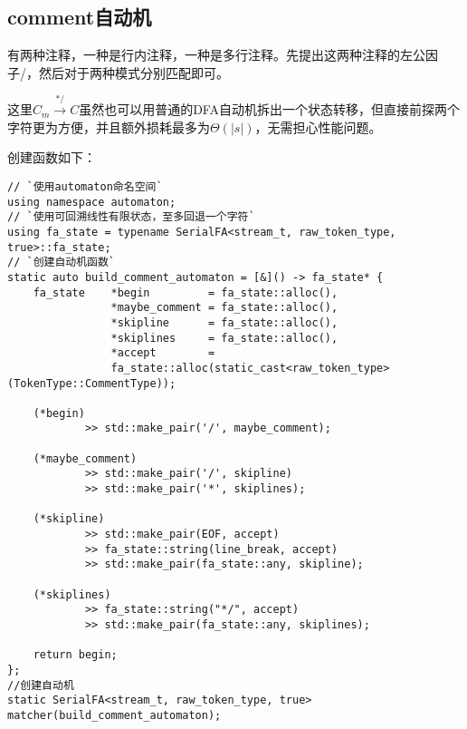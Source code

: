 \documentclass[UTF8]{ctexart}
\begin{document}
\subsection{comment自动机}
\begin{figure}[!h]
    \centering
\end{figure}

\par 有两种注释，一种是行内注释，一种是多行注释。先提出这两种注释的左公因子/，然后对于两种模式分别匹配即可。
\par 这里$C_m\xrightarrow{\text{*/}}C$虽然也可以用普通的DFA自动机拆出一个状态转移，但直接前探两个字符更为方便，并且额外损耗最多为$\Theta (|s|)$，无需担心性能问题。

\par 创建函数如下：
{\firacode
\begin{lstlisting}[language={[ANSI]C++}]
// `使用automaton命名空间`
using namespace automaton;
// `使用可回溯线性有限状态，至多回退一个字符`
using fa_state = typename SerialFA<stream_t, raw_token_type, true>::fa_state;
// `创建自动机函数`
static auto build_comment_automaton = [&]() -> fa_state* {
    fa_state    *begin         = fa_state::alloc(),
                *maybe_comment = fa_state::alloc(),
                *skipline      = fa_state::alloc(),
                *skiplines     = fa_state::alloc(),
                *accept        = 
                fa_state::alloc(static_cast<raw_token_type>(TokenType::CommentType));
    
    (*begin)
            >> std::make_pair('/', maybe_comment);
    
    (*maybe_comment)
            >> std::make_pair('/', skipline)
            >> std::make_pair('*', skiplines);
            
    (*skipline)
            >> std::make_pair(EOF, accept)
            >> fa_state::string(line_break, accept)
            >> std::make_pair(fa_state::any, skipline);
            
    (*skiplines)
            >> fa_state::string("*/", accept)
            >> std::make_pair(fa_state::any, skiplines);

    return begin;
};
//创建自动机
static SerialFA<stream_t, raw_token_type, true> matcher(build_comment_automaton);
\end{lstlisting}
}
\end{document}
